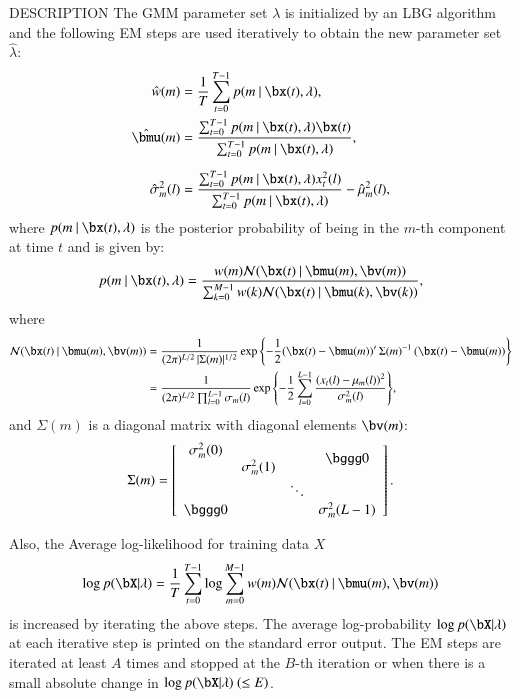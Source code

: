 \begin{qsection}{DESCRIPTION}
The GMM parameter set $\lambda$ is initialized by an LBG algorithm and
the following EM steps are used iteratively to obtain the new parameter set
$\hat{\lambda}$:
\begin{align}
   \hat{w}(m) & = \frac{1}{T}
   \sum_{t=0}^{T-1}p(m\mid\bx(t),\lambda),\notag\\
  \hat{\bmu}(m) & 
 = \frac{\sum_{t=0}^{T-1}p(m\mid\bx(t),\lambda)\bx(t)}
 {\sum_{t=0}^{T-1}p(m\mid\bx(t),\lambda)}, \notag\\[2mm]
  \hat{\sigma}_m^2(l)&
  =\frac{\sum_{t=0}^{T-1}p(m\mid\bx(t),\lambda)x_t^2(l)}
  {\sum_{t=0}^{T-1}p(m\mid\bx(t),\lambda)}
 - \hat{\mu}_m^2(l),\notag
\end{align}
where $p(m\mid\bx(t),\lambda)$ is the posterior probability of being in
the $m$-th component at time $t$ and is given by:
\begin{displaymath}
 p(m\mid\bx(t),\lambda)
 = \frac{w(m){\cal N}(\bx(t)\mid \bmu(m),\bv(m))}
 {\sum_{k=0}^{M-1}w(k){\cal N}(\bx(t)\mid \bmu(k),\bv(k))},
\end{displaymath}
 where
\begin{align}
 {\cal N}(\bx(t)\mid\bmu(m),\bv(m))%
 &=\frac{1}{(2\pi)^{L/2}\,|\Sigma(m)|^{1/2}}%
 \exp{\left\{-\frac{1}{2}%
 (\bx(t)-\bmu(m))'\,\Sigma(m)^{-1}\,%
 (\bx(t)-\bmu(m))\right\}}\notag\\
 &=\frac{1}{(2\pi)^{L/2}\prod_{l=0}^{L-1}\sigma_m(l)}%
 \exp{\left\{-\frac{1}{2}%
 \sum_{l=0}^{L-1}
 \frac{\left(x_t(l)-\mu_m(l)\right)^2}%
 {\sigma_m^2(l)}\right\}},\notag
\end{align}
and $\Sigma(m)$ is a diagonal matrix with diagonal elements
 $\bv(m)$:
\begin{displaymath}
 \Sigma(m)=\left[
 \begin{array}{cccc}
  \sigma_m^2(0) & & &\bigzerou\\
  & \sigma_m^2(1) & &\\
  & & \ddots &\\
  \bigzerol & & & \sigma_m^2(L-1)\\
 \end{array}\right].\notag
\end{displaymath}

Also, the Average log-likelihood for training data $X$
\begin{displaymath}
  \log p(\bX | \lambda)
 =\frac{1}{T}\sum_{t=0}^{T-1}
 \log\sum_{m=0}^{M-1}w(m){\cal N}(\bx(t)\mid\bmu(m),\bv(m))
\end{displaymath}
is increased by iterating the above steps. The average log-probability $\log
p(\bX|\lambda)$ at each iterative step is printed on the standard error output.
The EM steps are iterated at least $A$ times and stopped at the $B$-th
iteration or when there is a small absolute change in $\log p(\bX|\lambda)~(\leq
E)$.


\end{qsection}
